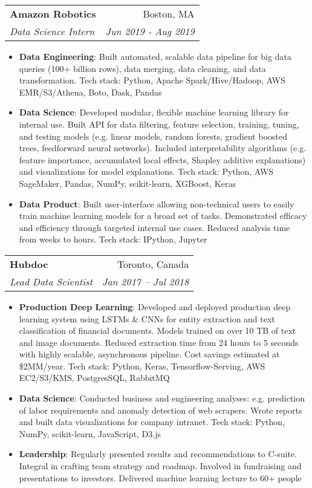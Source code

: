 \documentclass[letterpaper,11pt]{article}
\makeatletter
\newcommand{\resumeItem}[2]{
  \item\small{
    \textbf{#1}{: #2 \vspace{-2pt}}
  }
}
\newcommand{\resumeSubheading}[4]{
  \vspace{-1pt}\item
    \begin{tabular*}{0.97\textwidth}[t]{l@{\extracolsep{\fill}}r}
      \textbf{#1} & #2 \\
      \textit{\small#3} & \textit{\small #4} \\
    \end{tabular*}\vspace{-5pt}
}
\newcommand{\resumeItemListStart}{\begin{itemize}}
\newcommand{\resumeItemListEnd}{\end{itemize}\vspace{-5pt}}
\makeatother
\begin{document}
  \resumeSubheading
    {Amazon Robotics}{Boston, MA}
    {Data Science Intern}{Jun 2019 - Aug 2019}
    \resumeItemListStart
      \resumeItem{Data Engineering}
        {Built automated, scalable data pipeline for big data queries (100+ billion rows), data merging, data cleaning,
        and data transformation. Tech stack: Python, Apache Spark/Hive/Hadoop, AWS EMR/S3/Athena, Boto, Dask, Pandas}
      \resumeItem{Data Science}
        {Developed modular, flexible machine learning library for internal use. Built API for data filtering,
        feature selection, training, tuning, and testing models (e.g. linear models, random forests, gradient boosted trees,
        feedforward neural networks). Included interpretability algorithms (e.g. feature importance, accumulated local effects,
        Shapley additive explanations) and visualizations for model explanations. Tech stack: Python, AWS SageMaker, Pandas,
        NumPy, scikit-learn, XGBoost, Keras}
      \resumeItem{Data Product}
        {Built user-interface allowing non-technical users to easily train machine learning models for a broad set of tasks.
        Demonstrated efficacy and efficiency through targeted internal use cases. Reduced analysis time from weeks to hours.
        Tech stack: IPython, Jupyter}
    \resumeItemListEnd

    \resumeSubheading
      {Hubdoc}{Toronto, Canada}
      {Lead Data Scientist}{Jan 2017 -- Jul 2018}
      \resumeItemListStart
        \resumeItem{Production Deep Learning}
          {Developed and deployed production deep learning system using LSTMs \& CNNs for entity extraction and
          text classification of financial documents. Models trained on over 10 TB of text and image documents.
          Reduced extraction time from 24 hours to 5 seconds with highly scalable, asynchronous pipeline. Cost savings
          estimated at \$2MM/year. Tech stack: Python, Keras, Tensorflow-Serving, AWS EC2/S3/KMS, PostgresSQL, RabbitMQ}
        \resumeItem{Data Science}
          {Conducted business and engineering analyses: e.g. prediction of labor requirements and anomaly detection of web
          scrapers. Wrote reports and built data visualizations for company intranet. Tech stack: Python, NumPy, scikit-learn,
          JavaScript, D3.js}
        \resumeItem{Leadership}
          {Regularly presented results and recommendations to C-suite. Integral in crafting team strategy and
          roadmap. Involved in fundraising and presentations to investors. Delivered machine learning lecture to 60+ people}
      \resumeItemListEnd
\end{document}
